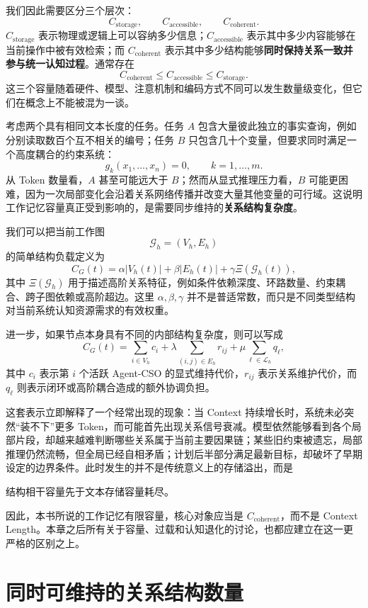 我们因此需要区分三个层次：
\[
C_{\mathrm{storage}},
\qquad
C_{\mathrm{accessible}},
\qquad
C_{\mathrm{coherent}}.
\]
$C_{\mathrm{storage}}$ 表示物理或逻辑上可以容纳多少信息；$C_{\mathrm{accessible}}$ 表示其中多少内容能够在当前操作中被有效检索；而 $C_{\mathrm{coherent}}$ 表示其中多少结构能够\textbf{同时保持关系一致并参与统一认知过程}。通常存在
\[
C_{\mathrm{coherent}}
\leq
C_{\mathrm{accessible}}
\leq
C_{\mathrm{storage}}.
\]
这三个容量随着硬件、模型、注意机制和编码方式不同可以发生数量级变化，但它们在概念上不能被混为一谈。

考虑两个具有相同文本长度的任务。任务 $A$ 包含大量彼此独立的事实查询，例如分别读取数百个互不相关的编号；任务 $B$ 只包含几十个变量，但要求同时满足一个高度耦合的约束系统：
\[
g_k(x_1,\ldots,x_n)=0,
\qquad
k=1,\ldots,m.
\]
从 Token 数量看，$A$ 甚至可能远大于 $B$；然而从显式推理压力看，$B$ 可能更困难，因为一次局部变化会沿着关系网络传播并改变大量其他变量的可行域。这说明工作记忆容量真正受到影响的，是需要同步维持的\textbf{关系结构复杂度}。

我们可以把当前工作图
\[
\mathcal{G}_h=(V_h,E_h)
\]
的简单结构负载定义为
\[
C_G(t)
=
\alpha |V_h(t)|
+
\beta |E_h(t)|
+
\gamma \Xi\!\left(\mathcal{G}_h(t)\right),
\]
其中 $\Xi(\mathcal{G}_h)$ 用于描述高阶关系特征，例如条件依赖深度、环路数量、约束耦合、跨子图依赖或高阶超边。这里 $\alpha,\beta,\gamma$ 并不是普适常数，而只是不同类型结构对当前系统认知资源需求的有效权重。

进一步，如果节点本身具有不同的内部结构复杂度，则可以写成
\[
C_G(t)
=
\sum_{i\in V_h} c_i
+
\lambda
\sum_{(i,j)\in E_h}r_{ij}
+
\mu
\sum_{\ell\in\mathcal{L}_h}q_\ell,
\]
其中 $c_i$ 表示第 $i$ 个活跃 Agent-CSO 的显式维持代价，$r_{ij}$ 表示关系维护代价，而 $q_\ell$ 则表示闭环或高阶耦合造成的额外协调负担。

这套表示立即解释了一个经常出现的现象：当 Context 持续增长时，系统未必突然“装不下”更多 Token，而可能首先出现关系信号衰减。模型依然能够看到各个局部片段，却越来越难判断哪些关系属于当前主要因果链；某些旧约束被遗忘，局部推理仍然流畅，但全局已经自相矛盾；计划后半部分满足最新目标，却破坏了早期设定的边界条件。此时发生的并不是传统意义上的存储溢出，而是
\begin{proposition*}
结构相干容量先于文本存储容量耗尽。
\end{proposition*}

因此，本书所说的工作记忆有限容量，核心对象应当是 $C_{\mathrm{coherent}}$，而不是 Context Length。本章之后所有关于容量、过载和认知退化的讨论，也都应建立在这一更严格的区别之上。


\section{同时可维持的关系结构数量}
\label{sec:wm-relational-capacity}

